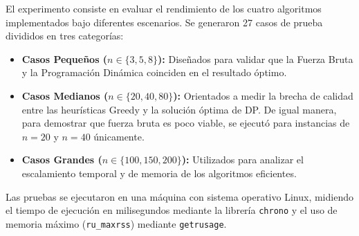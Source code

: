 
El experimento consiste en evaluar el rendimiento de los cuatro algoritmos implementados bajo diferentes escenarios. Se generaron 27 casos de prueba divididos en tres categorías:
\begin{itemize}
    \item \textbf{Casos Pequeños ($n \in \{3, 5, 8\}$):} Diseñados para validar que la Fuerza Bruta y la Programación Dinámica coinciden en el resultado óptimo.
    \item \textbf{Casos Medianos ($n \in \{20, 40, 80\}$):} Orientados a medir la brecha de calidad entre las heurísticas Greedy y la solución óptima de DP. De igual manera, para demostrar que fuerza bruta es poco viable, se ejecutó para instancias de $n=20$ y $n=40$ únicamente.
    \item \textbf{Casos Grandes ($n \in \{100, 150, 200\}$):} Utilizados para analizar el escalamiento temporal y de memoria de los algoritmos eficientes.
\end{itemize}

Las pruebas se ejecutaron en una máquina con sistema operativo Linux, midiendo el tiempo de ejecución en milisegundos mediante la librería \texttt{chrono} y el uso de memoria máximo (\texttt{ru\_maxrss}) mediante \texttt{getrusage}.
